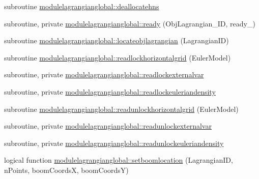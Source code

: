 \begin{DoxyCompactItemize}
\item 
subroutine \mbox{\hyperlink{namespacemodulelagrangianglobal_a34137a5604bf2312cac012e0415fdb9f}{modulelagrangianglobal\+::deallocatehns}}
\item 
subroutine, private \mbox{\hyperlink{namespacemodulelagrangianglobal_ab75b97011a170683ac68816525771168}{modulelagrangianglobal\+::ready}} (Obj\+Lagrangian\+\_\+\+ID, ready\+\_\+)
\item 
subroutine \mbox{\hyperlink{namespacemodulelagrangianglobal_adde8d4f2aa77a7a09dbd30d7200dcc6d}{modulelagrangianglobal\+::locateobjlagrangian}} (Lagrangian\+ID)
\item 
subroutine \mbox{\hyperlink{namespacemodulelagrangianglobal_adc70a932c70ec9be9f9ebdfe0fe60e08}{modulelagrangianglobal\+::readlockhorizontalgrid}} (Euler\+Model)
\item 
subroutine, private \mbox{\hyperlink{namespacemodulelagrangianglobal_a4051f81e28e0e18dc8950a11d2a7ae65}{modulelagrangianglobal\+::readlockexternalvar}}
\item 
subroutine, private \mbox{\hyperlink{namespacemodulelagrangianglobal_a050ae9cc2e89b6c4a9988fc3de650380}{modulelagrangianglobal\+::readlockeuleriandensity}}
\item 
subroutine \mbox{\hyperlink{namespacemodulelagrangianglobal_a4240be74d2a3261aba8c239da33b8efe}{modulelagrangianglobal\+::readunlockhorizontalgrid}} (Euler\+Model)
\item 
subroutine, private \mbox{\hyperlink{namespacemodulelagrangianglobal_ab2139b94b323af2c1671fe3b4340218f}{modulelagrangianglobal\+::readunlockexternalvar}}
\item 
subroutine, private \mbox{\hyperlink{namespacemodulelagrangianglobal_a553d94d2684b09095403feab67bef598}{modulelagrangianglobal\+::readunlockeuleriandensity}}
\item 
logical function \mbox{\hyperlink{namespacemodulelagrangianglobal_a026e5461ba329b59c22df0570d3c4cd4}{modulelagrangianglobal\+::setboomlocation}} (Lagrangian\+ID, n\+Points, boom\+CoordsX, boom\+CoordsY)
\end{DoxyCompactItemize}
